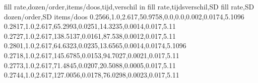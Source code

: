 fill rate,dozen/order,items/doos,tijd,verschil in fill rate,tijdsverschil,SD fill rate,SD dozen/order,SD items/doos
0.2566,1.0,2.617,50.9758,0.0,0.0,0.002,0.0174,5.1096
0.2817,1.0,2.617,65.2993,0.0251,14.3235,0.0014,0.017,5.11
0.2727,1.0,2.617,138.5137,0.0161,87.538,0.0012,0.017,5.11
0.2801,1.0,2.617,64.6323,0.0235,13.6565,0.0014,0.0174,5.1096
0.2718,1.0,2.617,145.6785,0.0153,94.7027,0.0021,0.017,5.11
0.2773,1.0,2.617,71.4845,0.0207,20.5088,0.0005,0.017,5.11
0.2744,1.0,2.617,127.0056,0.0178,76.0298,0.0023,0.017,5.11
